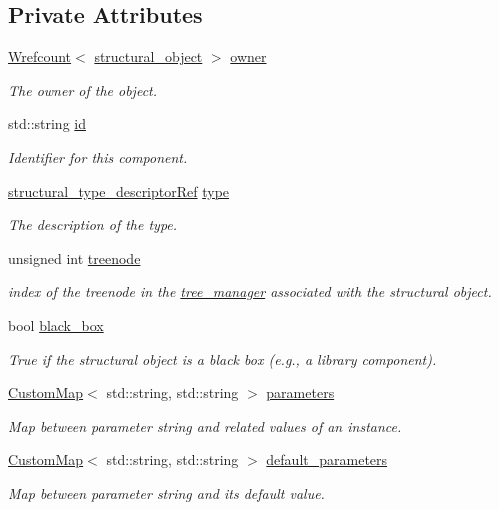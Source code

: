 \subsection*{Private Attributes}
\begin{DoxyCompactItemize}
\item 
\hyperlink{classWrefcount}{Wrefcount}$<$ \hyperlink{classstructural__object}{structural\+\_\+object} $>$ \hyperlink{classstructural__object_a3e96b3e00b8a78adfc44872d82e186ea}{owner}
\begin{DoxyCompactList}\small\item\em The owner of the object. \end{DoxyCompactList}\item 
std\+::string \hyperlink{classstructural__object_a841a75f6e349ff7c1987dc92d4ac33a6}{id}
\begin{DoxyCompactList}\small\item\em Identifier for this component. \end{DoxyCompactList}\item 
\hyperlink{structural__objects_8hpp_a219296792577e3292783725961506c83}{structural\+\_\+type\+\_\+descriptor\+Ref} \hyperlink{classstructural__object_a9a7159ce4c8da9984f256d9032f49778}{type}
\begin{DoxyCompactList}\small\item\em The description of the type. \end{DoxyCompactList}\item 
unsigned int \hyperlink{classstructural__object_a2907697d982702311dcbcef8c0e1d3f4}{treenode}
\begin{DoxyCompactList}\small\item\em index of the treenode in the \hyperlink{classtree__manager}{tree\+\_\+manager} associated with the structural object. \end{DoxyCompactList}\item 
bool \hyperlink{classstructural__object_a03b36075116b434d1629fc7eeb4f452c}{black\+\_\+box}
\begin{DoxyCompactList}\small\item\em True if the structural object is a black box (e.\+g., a library component). \end{DoxyCompactList}\item 
\hyperlink{custom__map_8hpp_a18ca01763abbe3e5623223bfe5aaac6b}{Custom\+Map}$<$ std\+::string, std\+::string $>$ \hyperlink{classstructural__object_ab665280607e11d5ae406f1760ebc9881}{parameters}
\begin{DoxyCompactList}\small\item\em Map between parameter string and related values of an instance. \end{DoxyCompactList}\item 
\hyperlink{custom__map_8hpp_a18ca01763abbe3e5623223bfe5aaac6b}{Custom\+Map}$<$ std\+::string, std\+::string $>$ \hyperlink{classstructural__object_ae34f6bc1b3949158817b7ae33fb93882}{default\+\_\+parameters}
\begin{DoxyCompactList}\small\item\em Map between parameter string and its default value. \end{DoxyCompactList}\end{DoxyCompactItemize}
